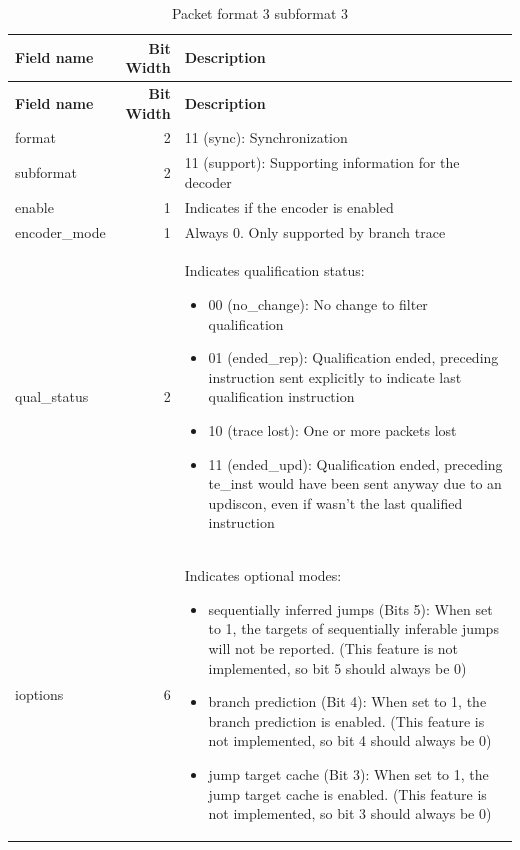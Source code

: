 \documentclass[main\_\_EN.tex]{subfiles}
\begin{document}
\begin{longtable}[c]{ |l|r|L{10cm}| }
    \caption{Packet format 3 subformat 3}
    \label{tab:f3s3}
    \\\hline{}
    \textbf{Field name} & \textbf{Bit Width} & \textbf{Description} \\\hline
    \endfirsthead
    \hline{}
    \textbf{Field name} & \textbf{Bit Width} & \textbf{Description} \\\hline
    \endhead
    \endfoot
    \endlastfoot

    format & 2 & 11 (sync): Synchronization \\\hline
    subformat & 2 & 11 (support): Supporting information for the decoder \\\hline
    enable & 1 & Indicates if the encoder is enabled \\\hline
    encoder\_mode & 1 & Always 0. Only supported by branch trace \\\hline
    qual\_status & 2 & Indicates qualification status:
    \begin{itemize}
        \item 00 (no\_change): No change to filter qualification
        \item 01 (ended\_rep): Qualification ended, preceding instruction sent explicitly to indicate last qualification instruction
        \item 10 (trace lost): One or more packets lost
        \item 11 (ended\_upd): Qualification ended, preceding te\_inst would have been sent anyway due to an updiscon, even if wasn't the last qualified instruction
        \vspace{-1.5em}
    \end{itemize}
    \\\hline
    ioptions & 6 & Indicates optional modes:
    \begin{itemize}
        \item sequentially inferred jumps (Bits 5): When set to 1, the targets of sequentially inferable jumps will not be reported. (This feature is not implemented, so bit 5 should always be 0)
        \item branch prediction (Bit 4): When set to 1, the branch prediction is enabled. (This feature is not implemented, so bit 4 should always be 0)
        \item jump target cache (Bit 3): When set to 1, the jump target cache is enabled. (This feature is not implemented, so bit 3 should always be 0)

\end{itemize}
\end{longtable}
\end{document}
